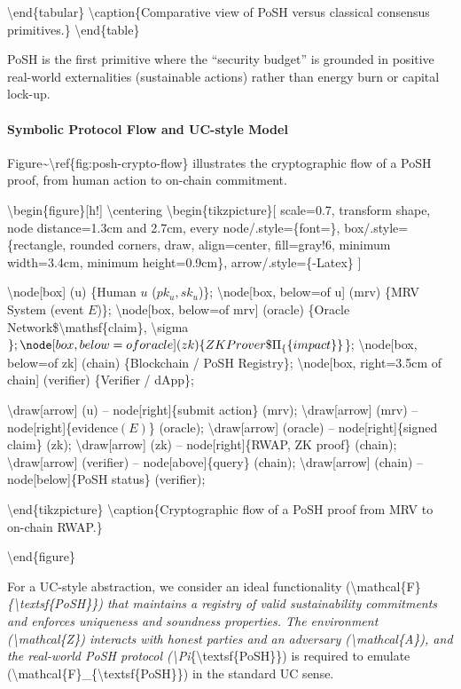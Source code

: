 \documentclass{article}
\begin{document}
{\textbackslash}end\{tabular\}
{\textbackslash}caption\{Comparative view of PoSH versus classical consensus primitives.\}
{\textbackslash}end\{table\}

PoSH is the first primitive where the ``security budget'' is grounded in
positive real-world externalities (sustainable actions) rather than energy
burn or capital lock-up.

\paragraph{Symbolic Protocol Flow and UC-style Model}

Figure{\textasciitilde}{\textbackslash}ref\{fig:posh-crypto-flow\} illustrates the cryptographic flow of a PoSH
proof, from human action to on-chain commitment.

{\textbackslash}begin\{figure\}[h!]
{\textbackslash}centering
{\textbackslash}begin\{tikzpicture\}[
scale=0.7,
transform shape,
node distance=1.3cm and 2.7cm,
every node/.style=\{font=\},
box/.style=\{rectangle, rounded corners, draw, align=center, fill=gray!6,
minimum width=3.4cm, minimum height=0.9cm\},
arrow/.style=\{-Latex\}
]

{\textbackslash}node[box] (u) \{Human $u$
($pk_u, sk_u$)\};
{\textbackslash}node[box, below=of u] (mrv) \{MRV System
(event $E$)\};
{\textbackslash}node[box, below=of mrv] (oracle) \{Oracle Network\${\textbackslash}mathsf\{claim\}, {\textbackslash}sigma$\};
  \node[box, below=of oracle] (zk) \{ZK Prover\$\Pi_\{\textsf\{impact\}\}$\};
{\textbackslash}node[box, below=of zk] (chain) \{Blockchain /
PoSH Registry\};
{\textbackslash}node[box, right=3.5cm of chain] (verifier) \{Verifier / dApp\};

{\textbackslash}draw[arrow] (u) -- node[right]\{submit action\} (mrv);
{\textbackslash}draw[arrow] (mrv) -- node[right]\{evidence$(E)$\} (oracle);
{\textbackslash}draw[arrow] (oracle) -- node[right]\{signed claim\} (zk);
{\textbackslash}draw[arrow] (zk) -- node[right]\{RWAP, ZK proof\} (chain);
{\textbackslash}draw[arrow] (verifier) -- node[above]\{query\} (chain);
{\textbackslash}draw[arrow] (chain) -- node[below]\{PoSH status\} (verifier);

{\textbackslash}end\{tikzpicture\}
{\textbackslash}caption\{Cryptographic flow of a PoSH proof from MRV to on-chain RWAP.\}

{\textbackslash}end\{figure\}

For a UC-style abstraction, we consider an ideal functionality
({\textbackslash}mathcal\{F\}\textit{\{{\textbackslash}textsf\{PoSH\}\}) that maintains a registry of valid sustainability
commitments and enforces uniqueness and soundness properties. The environment
({\textbackslash}mathcal\{Z\}) interacts with honest parties and an adversary ({\textbackslash}mathcal\{A\}),
and the real-world PoSH protocol ({\textbackslash}Pi}\{{\textbackslash}textsf\{PoSH\}\}) is required to emulate
({\textbackslash}mathcal\{F\}\_\{{\textbackslash}textsf\{PoSH\}\}) in the standard UC sense.
\end{document}
